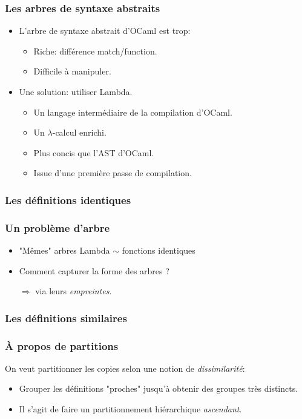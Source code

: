 \documentclass[11pt]{beamer}
\begin{document}
\begin{frame}
\frametitle{Les arbres de syntaxe abstraits}
\begin{itemize}
\item L'arbre de syntaxe abstrait d'OCaml est trop:
	\begin{itemize}
		\item Riche: différence match/function.
		\item Difficile à manipuler.
	\end{itemize}
\pause
\item Une solution: \alert{utiliser Lambda}.
	\begin{itemize}
	\item Un langage intermédiaire de la compilation d'OCaml.
	\item Un $\lambda$-calcul enrichi.
	\item Plus concis que l'AST d'OCaml.
	\item Issue d'une première passe de compilation.
\end{itemize}
\end{itemize}
\end{frame}

\subsubsection{Les définitions identiques}
\begin{frame}
\frametitle{Un problème d'arbre}
\begin{itemize}
\item "Mêmes" arbres Lambda $\sim$ fonctions identiques
\item Comment capturer la forme des arbres ?
\pause
\item[$\Rightarrow$] via leurs \emph{empreintes}.
\end{itemize}
\end{frame}

\subsubsection{Les définitions similaires}
\begin{frame}
	\frametitle{À propos de partitions}
On veut partitionner les copies selon une notion de \emph{dissimilarité}:
\begin{itemize}
\item Grouper les définitions "proches" jusqu'à obtenir des groupes très distincts.
\item Il s'agit de faire un partitionnement hiérarchique \emph{ascendant}.
\end{itemize}
\end{frame}
\end{document}
